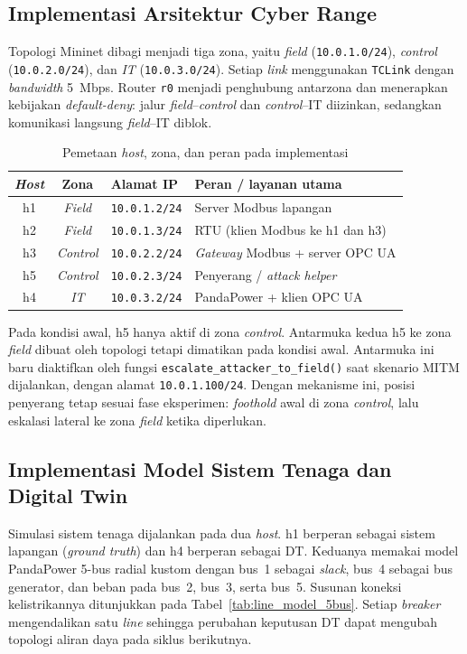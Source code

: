 \subsection{Implementasi Arsitektur Cyber Range}
\label{subsec:implementasi_arsitektur_cyber_range}
Topologi Mininet dibagi menjadi tiga zona, yaitu \textit{field} (\texttt{10.0.1.0/24}), \textit{control} (\texttt{10.0.2.0/24}), dan \textit{IT} (\texttt{10.0.3.0/24}). Setiap \textit{link} menggunakan \texttt{TCLink} dengan \textit{bandwidth} 5~Mbps. Router \texttt{r0} menjadi penghubung antarzona dan menerapkan kebijakan \textit{default-deny}: jalur \textit{field}--\textit{control} dan \textit{control}--IT diizinkan, sedangkan komunikasi langsung \textit{field}--IT diblok.

\begin{table}[htbp]
\centering
\caption{Pemetaan \textit{host}, zona, dan peran pada implementasi}
\begin{tabular}{|c|c|l|l|}
    \hline
    \textbf{\textit{Host}} & \textbf{Zona} & \textbf{Alamat IP} & \textbf{Peran / layanan utama} \\ \hline
    h1 & \textit{Field} & \texttt{10.0.1.2/24} & Server Modbus lapangan \\ \hline
    h2 & \textit{Field} & \texttt{10.0.1.3/24} & RTU (klien Modbus ke h1 dan h3) \\ \hline
    h3 & \textit{Control} & \texttt{10.0.2.2/24} & \textit{Gateway} Modbus + server OPC UA \\ \hline
    h5 & \textit{Control} & \texttt{10.0.2.3/24} & Penyerang / \textit{attack helper} \\ \hline
    h4 & \textit{IT} & \texttt{10.0.3.2/24} & PandaPower + klien OPC UA \\ \hline
\end{tabular}
\label{tab:host_list_impl}
\end{table}

Pada kondisi awal, h5 hanya aktif di zona \textit{control}. Antarmuka kedua h5 ke zona \textit{field} dibuat oleh topologi tetapi dimatikan pada kondisi awal. Antarmuka ini baru diaktifkan oleh fungsi \texttt{escalate\_attacker\_to\_field()} saat skenario \ac{MITM} dijalankan, dengan alamat \texttt{10.0.1.100/24}. Dengan mekanisme ini, posisi penyerang tetap sesuai fase eksperimen: \textit{foothold} awal di zona \textit{control}, lalu eskalasi lateral ke zona \textit{field} ketika diperlukan.

\subsection{Implementasi Model Sistem Tenaga dan Digital Twin}
\label{subsec:implementasi_digital_twin}
Simulasi sistem tenaga dijalankan pada dua \textit{host}. h1 berperan sebagai sistem lapangan (\textit{ground truth}) dan h4 berperan sebagai \ac{DT}. Keduanya memakai model PandaPower 5-bus radial kustom dengan bus~1 sebagai \textit{slack}, bus~4 sebagai bus generator, dan beban pada bus~2, bus~3, serta bus~5. Susunan koneksi kelistrikannya ditunjukkan pada Tabel~\ref{tab:line_model_5bus}. Setiap \textit{breaker} mengendalikan satu \textit{line} sehingga perubahan keputusan \ac{DT} dapat mengubah topologi aliran daya pada siklus berikutnya.

